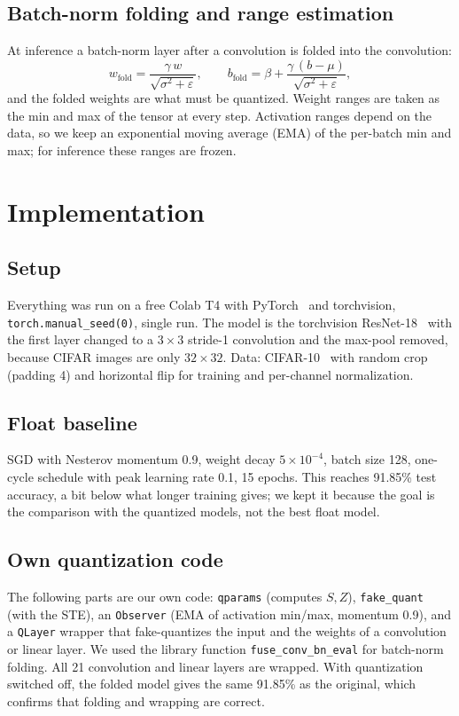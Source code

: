 \documentclass[conference]{IEEEtran}
\begin{document}
\subsection{Batch-norm folding and range estimation}
At inference a batch-norm layer after a convolution is folded into the convolution:
\begin{equation}
w_{\text{fold}}=\frac{\gamma\,w}{\sqrt{\sigma^2+\varepsilon}},\qquad b_{\text{fold}}=\beta+\frac{\gamma\,(b-\mu)}{\sqrt{\sigma^2+\varepsilon}},
\end{equation}
and the folded weights are what must be quantized. Weight ranges are taken as the min and max of the tensor at every step. Activation ranges depend on the data, so we keep an exponential moving average (EMA) of the per-batch min and max; for inference these ranges are frozen.

\section{Implementation}
\subsection{Setup}
Everything was run on a free Colab T4 with PyTorch~\cite{paszke2019} and torchvision, \texttt{torch.manual\_seed(0)}, single run. The model is the torchvision ResNet-18~\cite{he2016} with the first layer changed to a $3{\times}3$ stride-1 convolution and the max-pool removed, because CIFAR images are only $32{\times}32$. Data: CIFAR-10~\cite{krizhevsky2009} with random crop (padding 4) and horizontal flip for training and per-channel normalization.

\subsection{Float baseline}
SGD with Nesterov momentum 0.9, weight decay $5\times10^{-4}$, batch size 128, one-cycle schedule with peak learning rate 0.1, 15 epochs. This reaches 91.85\% test accuracy, a bit below what longer training gives; we kept it because the goal is the comparison with the quantized models, not the best float model.

\subsection{Own quantization code}
The following parts are our own code: \texttt{qparams} (computes $S,Z$), \texttt{fake\_quant} (with the STE), an \texttt{Observer} (EMA of activation min/max, momentum 0.9), and a \texttt{QLayer} wrapper that fake-quantizes the input and the weights of a convolution or linear layer. We used the library function \texttt{fuse\_conv\_bn\_eval} for batch-norm folding. All 21 convolution and linear layers are wrapped. With quantization switched off, the folded model gives the same 91.85\% as the original, which confirms that folding and wrapping are correct.
\end{document}
